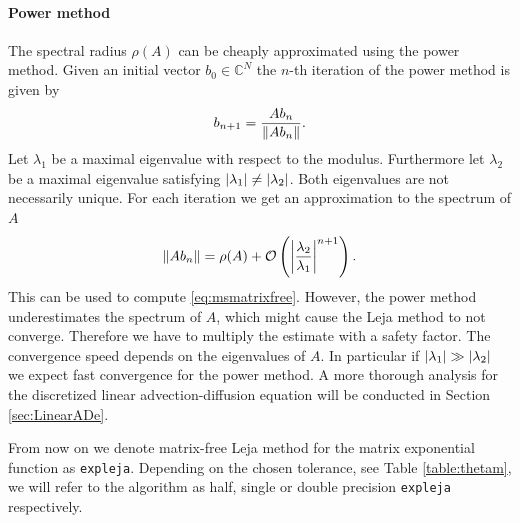 \documentclass{scrartcl}
\begin{document}
	\paragraph{Power method}
	The spectral radius $\rho(A)$ can be cheaply approximated using the power method. 
	Given an initial vector $b_0\in\mathbb{C}^N$ the $n$-th iteration of the power method is given by
	\[
		b_{n+1} = \frac{Ab_n}{\lVert Ab_n\rVert}.
	\]
	Let $\lambda_{1}$ be a maximal eigenvalue with respect to the modulus. Furthermore let $\lambda_2$ be a maximal eigenvalue satisfying $\lvert\lambda_{1}\rvert\neq\lvert\lambda_2\rvert$. 
	Both eigenvalues are not necessarily unique.
	For each iteration we get an approximation to the spectrum of $A$
	\[ 
	\lVert Ab_{n}\rVert = \rho(A) + \mathcal{O}\left(\left\lvert\frac{\lambda_2}{\lambda_1}\right\rvert^{n+1}\right).
	\]  
	This can be used to compute \eqref{eq:msmatrixfree}. However, the power method underestimates the spectrum of $A$, which might cause the Leja method to not converge. Therefore we have to multiply the estimate with a safety factor. The convergence speed depends on the eigenvalues of $A$. In particular if $\lvert\lambda_{1}\rvert\gg\lvert\lambda_{2}\rvert$ we expect fast convergence for the power method. A more thorough analysis for the discretized linear advection-diffusion equation will be conducted in Section \ref{sec:LinearADe}.

	From now on we denote matrix-free Leja method for the matrix exponential function as \texttt{expleja}. Depending on the chosen tolerance, see Table \ref{table:thetam}, we will refer to the algorithm as half, single or double precision \texttt{expleja} respectively.
	
\end{document}
